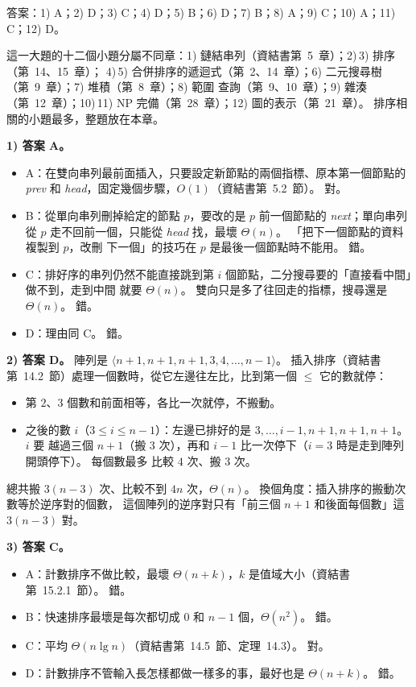 \begin{pastsoln}
答案：1) A；2) D；3) C；4) D；5) B；6) D；7) B；8) A；9) C；10) A；11) C；12) D。

這一大題的十二個小題分屬不同章：1) 鏈結串列（資結書第~5~章）；2)\,3) 排序（第~14、15~章）；
4)\,5) 合併排序的遞迴式（第~2、14~章）；6) 二元搜尋樹（第~9~章）；7) 堆積（第~8~章）；8) 範圍
查詢（第~9、10~章）；9) 雜湊（第~12~章）；10)\,11) NP 完備（第~28~章）；12) 圖的表示（第~21~章）。
排序相關的小題最多，整題放在本章。

\textbf{1) 答案 A。}
\begin{itemize}
\item A：在雙向串列最前面插入，只要設定新節點的兩個指標、原本第一個節點的 \textit{prev} 和
\textit{head}，固定幾個步驟，$O(1)$（資結書第~5.2~節）。 對。
\item B：從單向串列刪掉給定的節點 $p$，要改的是 $p$ 前一個節點的 \textit{next}；單向串列從 $p$
走不回前一個，只能從 \textit{head} 找，最壞 $\Theta(n)$。 「把下一個節點的資料複製到 $p$，改刪
下一個」的技巧在 $p$ 是最後一個節點時不能用。 錯。
\item C：排好序的串列仍然不能直接跳到第 $i$ 個節點，二分搜尋要的「直接看中間」做不到，走到中間
就要 $\Theta(n)$。 雙向只是多了往回走的指標，搜尋還是 $\Theta(n)$。 錯。
\item D：理由同 C。 錯。
\end{itemize}

\textbf{2) 答案 D。} 陣列是 $\langle n+1, n+1, n+1, 3, 4, \ldots, n-1\rangle$。 插入排序（資結書
第~14.2~節）處理一個數時，從它左邊往左比，比到第一個 $\le$ 它的數就停：
\begin{itemize}
\item 第 $2$、$3$ 個數和前面相等，各比一次就停，不搬動。
\item 之後的數 $i$（$3 \le i \le n-1$）：左邊已排好的是 $3, \ldots, i-1, n+1, n+1, n+1$。 $i$ 要
越過三個 $n+1$（搬 $3$ 次），再和 $i-1$ 比一次停下（$i = 3$ 時是走到陣列開頭停下）。 每個數最多
比較 $4$ 次、搬 $3$ 次。
\end{itemize}
總共搬 $3(n-3)$ 次、比較不到 $4n$ 次，$\Theta(n)$。 換個角度：插入排序的搬動次數等於逆序對的個數，
這個陣列的逆序對只有「前三個 $n+1$ 和後面每個數」這 $3(n-3)$ 對。

\textbf{3) 答案 C。}
\begin{itemize}
\item A：計數排序不做比較，最壞 $\Theta(n + k)$，$k$ 是值域大小（資結書第~15.2.1~節）。 錯。
\item B：快速排序最壞是每次都切成 $0$ 和 $n-1$ 個，$\Theta(n^2)$。 錯。
\item C：平均 $\Theta(n \lg n)$（資結書第~14.5~節、定理~14.3）。 對。
\item D：計數排序不管輸入長怎樣都做一樣多的事，最好也是 $\Theta(n + k)$。 錯。
\end{itemize}


\end{pastsoln}
